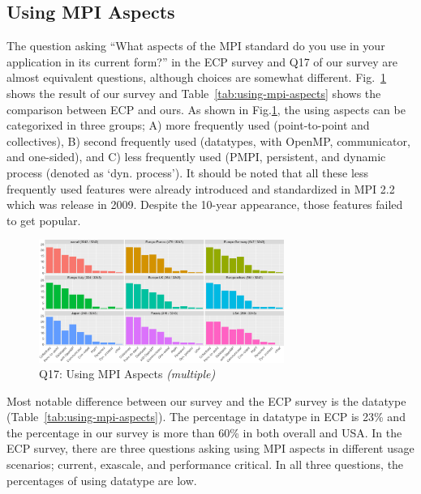 \documentclass[conference,10pt,letterpaper]{IEEEtran}
\def\myquote#1{`#1'}
\begin{document}
\subsection{Using MPI Aspects}

The question asking ``What aspects of the MPI standard do you use in
your application in its current form?'' in the ECP survey and Q17 of
our survey are almost equivalent
questions, although choices are somewhat
different. Fig.~\ref{fig:using-mpi-aspects} shows the result of our 
survey and Table~\ref{tab:using-mpi-aspects} shows the comparison
between ECP and ours. As shown in Fig.\ref{fig:using-mpi-aspects}, the
using aspects can be categorixed in three groups; A) more frequently
used (point-to-point and collectives), B) second frequently used
(datatypes, with OpenMP, communicator, and one-sided), and C) less
frequently used (PMPI, persistent, and dynamic process (denoted as
\myquote{dyn. process}).
It should be noted that all these less frequently used features were
already introduced and standardized in MPI 2.2 which was release in
2009. Despite the 10-year appearance, those features failed to get
popular.  

\begin{figure}[htb]
\begin{center}
\includegraphics[width=8cm]{R-scripts/Q17.pdf}
\caption{Q17: Using MPI Aspects {\it(multiple)}}
\label{fig:using-mpi-aspects}
\end{center}
\end{figure}

Most notable difference between our survey and the ECP survey is the
datatype (Table~\ref{tab:using-mpi-aspects}). The percentage in
datatype in ECP is 23\% and the percentage in our survey is more
than 60\% in both overall and USA. In the ECP survey, there are three
questions asking using MPI aspects in different usage scenarios; current,
exascale, and performance critical. In all three questions, the
percentages of using datatype are low.
\end{document}
